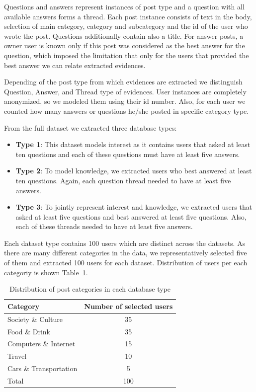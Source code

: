 \documentclass[conference]{IEEEtran}
\newcommand{\tblref}[1]{Table~\ref{#1}}
\begin{document}
Questions and answers represent instances of post type and a question with all available answers forms a thread. Each post instance consists of text in the body, selection of main category, category and subcategory and the id of the user who wrote the post. Questions additionally contain also a title. For answer posts, a owner user is known only if this post was considered as the best answer for the question, which imposed the limitation that only for the users that provided the best answer we can relate extracted evidences.

Depending of the post type from which evidences are extracted we distinguish Question, Answer, and Thread type of evidences. User instances are completely anonymized, so we modeled them using their id number. Also, for each user we counted how many answers or questions he/she posted in specific category type.

From the full dataset we extracted three database types:
\begin{itemize}
	\item {\bf Type 1}: This dataset models interest as it contains users that asked at least ten questions and each of these questions must have at least five answers.
	\item {\bf Type 2}: To model knowledge, we extracted users who best answered at least ten questions. Again, each question thread needed to have at least five answers.
	\item {\bf Type 3}: To jointly represent interest and knowledge, we extracted users that asked at least five questions and best answered at least five questions. Also, each of these threads needed to have at least five answers.
\end{itemize}
Each dataset type contains 100 users which are distinct across the datasets. As there are many different categories in the data, we representatively selected five of them and extracted 100 users for each dataset. Distribution of users per each categoriy is shown \tblref{tab:datasets}.

\begin{table}[!h]
	\centering
	\renewcommand{\arraystretch}{1.3}
	\caption{Distribution of post categories in each database type}
	\label{tab:datasets}
	\begin{tabular}{l|c}\hline
		Category & Number of selected users\\\hline\hline
		Society \& Culture & 35\\
		Food \& Drink & 35\\
		Computers \& Internet & 15\\
		Travel & 10\\
		Cars \& Transportation & 5\\\hline\hline
		Total & 100\\\hline
	\end{tabular}
\end{table}
\end{document}
